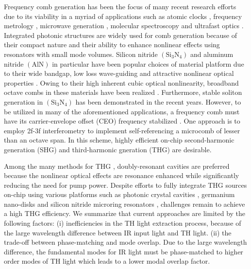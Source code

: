 \documentclass[9pt,twocolumn,twoside]{optica}
\begin{document}
Frequency comb generation has been the focus of many recent research efforts due to its viability in a myriad of applications such as atomic clocks \cite{Papp:14,Diddams:01}, frequency metrology \cite{Keilmann:04,Udem:02}, microwave generation \cite{Diddams:00,Yi:15}, molecular spectroscopy \cite{Haakestad:13,Cruz:15} and ultrafast optics \cite{Cundiff:03,Roslund:14}. Integrated photonic structures are widely used for comb generation because of their compact nature and their ability to enhance nonlinear effects using resonators with small mode volumes. Silicon nitride $\mathrm{(Si_3N_4)}$ and aluminum nitride $\mathrm{(AlN)}$ in particular have been popular choices of material platform due to their wide bandgap, low loss wave-guiding and attractive nonlinear optical properties \cite{Guo:16,Okawachi:11,Jung:13,Liu:14,Pfeiffer:17}. Owing to their high inherent cubic optical nonlinearity, broadband octave combs in these materials have been realized \cite{Li:17,liu:16}. Furthermore, stable soliton generation in $\mathrm{(Si_3N_4)}$ has been demonstrated \cite{Li:17,Brasch:16,Pfeiffer:17} in the recent years. However, to be utilized in many of the aforementioned applications, a frequency comb must have its carrier-envelope offset (CEO) frequency stabilized \cite{delhaye:08,Bartels:09}. One approach is to employ 2f-3f interferometry  \cite{Brasch:17,Wang:16} to implement self-referencing a microcomb of lesser than an octave span. In this scheme, highly efficient on-chip second-harmonic generation (SHG) and third-harmonic gneration (THG) are desirable. 

Among the many methods for THG \cite{Kajzar:85,Lippitz:05,New:67,Hong:13,Levy:11,Carmon:07}, doubly-resonant cavities are preferred because the nonlinear optical effects are resonance enhanced while significantly reducing the need for pump power. Despite efforts to fully integrate THG sources on-chip using various platforms such as photonic crystal cavities \cite{Corcoran:09}, germanium nano-disks \cite{Grinblat:16} and silicon nitride microring resonators \cite{Levy:11}, challenges remain to achieve a high THG efficiency. We summarize that current approaches are limited by the following factors: (i) inefficiencies in the TH light extraction process, because of the large wavelength difference between IR input light and TH light. (ii) the trade-off between phase-matching and mode overlap. Due to the large wavelength difference, the fundamental modes for IR light must be phase-matched to higher order modes of TH light which leads to a lower modal overlap factor.
\end{document}

